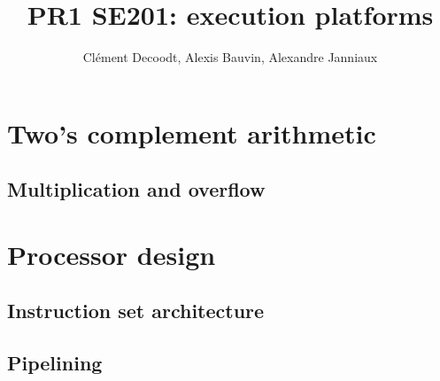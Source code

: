 \documentclass{report}
\author{Clément Decoodt, Alexis Bauvin, Alexandre Janniaux}
\title{PR1 SE201: execution platforms}
\begin{document}
\maketitle

\section{Two's complement arithmetic}

\subsection{}

\subsection{}

\subsection{}

\subsection{Multiplication and overflow}

\section{Processor design}

\subsection{Instruction set architecture}

\subsection{Pipelining}
\end{document}
